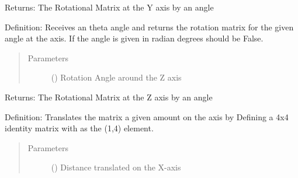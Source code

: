 \documentclass[letterpaper,10pt,english,openany,oneside]{sphinxmanual}
\begin{document}
\begin{fulllineitems}
\begin{fulllineitems}
Returns: The Rotational Matrix at the Y axis by an  angle

\end{fulllineitems}


\begin{fulllineitems}
\label{\detokenize{MatrixManipulationSymbolic:MatrixManipulationSymbolic.MatrixSymbolic.rot_z}}
Definition: Receives an theta angle and returns the rotation matrix for the given angle at the  axis.
If the angle is given in radian degrees should be False.
\begin{quote}\begin{description}
\item[{Parameters}] \leavevmode
{} () \textendash{} Rotation Angle around the Z axis

\end{description}\end{quote}

Returns: The Rotational Matrix at the Z axis by an  angle

\end{fulllineitems}


\begin{fulllineitems}
\label{\detokenize{MatrixManipulationSymbolic:MatrixManipulationSymbolic.MatrixSymbolic.trans_x}}
Definition: Translates the matrix a given amount  on the  axis by Defining a 4x4 identity
matrix with  as the (1,4) element.
\begin{quote}\begin{description}
\item[{Parameters}] \leavevmode
{} () \textendash{} Distance translated on the X-axis

\end{description}\end{quote}


\end{fulllineitems}
\end{fulllineitems}
\end{document}
